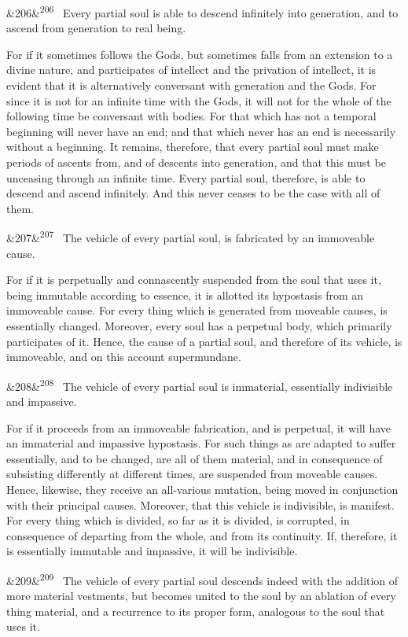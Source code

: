 \documentclass[12pt]{article}
\newcommand{\para}[1][]{\par\noindent\ifx&#1&\else\textsuperscript{\footnotesize #1}~\fi}
\begin{document}
\para[206] Every partial soul is able to descend infinitely into generation, and to ascend from generation to real being.

For if it sometimes follows the Gods, but sometimes falls from an extension to a divine nature, and participates of intellect and the privation of intellect, it is evident that it is alternatively conversant with generation and the Gods. For since it is not for an infinite time with the Gods, it will not for the whole of the following time be conversant with bodies. For that which has not a temporal beginning will never have an end; and that which never has an end is necessarily without a beginning. It remains, therefore, that every partial soul must make periods of ascents from, and of descents into generation, and that this must be unceasing through an infinite time. Every partial soul, therefore, is able to descend and ascend infinitely. And this never ceases to be the case with all of them.

\para[207] The vehicle of every partial soul, is fabricated by an immoveable cause.

For if it is perpetually and connascently suspended from the soul that uses it, being immutable according to essence, it is allotted its hypostasis from an immoveable cause. For every thing which is generated from moveable causes, is essentially changed. Moreover, every soul has a perpetual body, which primarily participates of it. Hence, the cause of a partial soul, and therefore of its vehicle, is immoveable, and on this account supermundane.

\para[208] The vehicle of every partial soul is immaterial, essentially indivisible and impassive.

For if it proceeds from an immoveable fabrication, and is perpetual, it will have an immaterial and impassive hypostasis. For such things as are adapted to suffer essentially, and to be changed, are all of them material, and in consequence of subsisting differently at different times, are suspended from moveable causes. Hence, likewise, they receive an all-various mutation, being moved in conjunction with their principal causes. Moreover, that this vehicle is indivisible, is manifest. For every thing which is divided, so far as it is divided, is corrupted, in consequence of departing from the whole, and from its continuity. If, therefore, it is essentially immutable and impassive, it will be indivisible.

\para[209] The vehicle of every partial soul descends indeed with the addition of more material vestments, but becomes united to the soul by an ablation of every thing material, and a recurrence to its proper form, analogous to the soul that uses it.
\end{document}
